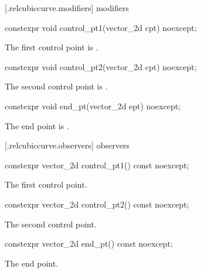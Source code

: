  [\iotwod.relcubiccurve.modifiers]{ modifiers}

%
\begin{itemdecl}
constexpr void control_pt1(vector_2d cpt) noexcept;
\end{itemdecl}
\begin{itemdescr}
\pnum
\effects
The first control point is .
\end{itemdescr}

%
\begin{itemdecl}
constexpr void control_pt2(vector_2d cpt) noexcept;
\end{itemdecl}
\begin{itemdescr}
\pnum
\effects
The second control point is .
\end{itemdescr}

%
\begin{itemdecl}
constexpr void end_pt(vector_2d ept) noexcept;
\end{itemdecl}
\begin{itemdescr}
\pnum
\effects
The end point is .
\end{itemdescr}

 [\iotwod.relcubiccurve.observers]{ observers}

%
\begin{itemdecl}
constexpr vector_2d control_pt1() const noexcept;
\end{itemdecl}
\begin{itemdescr}
\pnum
\returns
The first control point.
\end{itemdescr}

%
\begin{itemdecl}
constexpr vector_2d control_pt2() const noexcept;
\end{itemdecl}
\begin{itemdescr}
\pnum
\returns
The second control point.
\end{itemdescr}

%
\begin{itemdecl}
constexpr vector_2d end_pt() const noexcept;
\end{itemdecl}
\begin{itemdescr}
\pnum
\returns
The end point.
\end{itemdescr}

